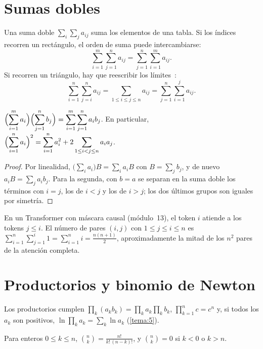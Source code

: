 \section{Sumas dobles}

Una suma doble $\sum_{i}\sum_{j}a_{ij}$ suma los elementos de una tabla. Si los índices recorren un rectángulo, el orden de suma puede intercambiarse:
\[
\sum_{i=1}^m\sum_{j=1}^na_{ij}=\sum_{j=1}^n\sum_{i=1}^ma_{ij}.
\]
Si recorren un triángulo, hay que reescribir los límites~\cite[§2.4]{gkp}:
\[
\sum_{i=1}^n\sum_{j=i}^na_{ij}=\sum_{1\le i\le j\le n}a_{ij}=\sum_{j=1}^n\sum_{i=1}^ja_{ij}.
\]

\begin{proposicion}\label{prop:producto-sumas}
$\displaystyle\Bigl(\sum_{i=1}^ma_i\Bigr)\Bigl(\sum_{j=1}^nb_j\Bigr)=\sum_{i=1}^m\sum_{j=1}^na_ib_j$. En particular, $\displaystyle\Bigl(\sum_{i=1}^na_i\Bigr)^2=\sum_{i=1}^na_i^2+2\sum_{1\le i<j\le n}a_ia_j$.
\end{proposicion}

\begin{proof}
Por linealidad, $\bigl(\sum_ia_i\bigr)B=\sum_ia_iB$ con $B=\sum_jb_j$, y de nuevo $a_iB=\sum_ja_ib_j$. Para la segunda, con $b=a$ se separan en la suma doble los términos con $i=j$, los de $i<j$ y los de $i>j$; los dos últimos grupos son iguales por simetría.
\end{proof}

\begin{ejemplo}\label{ej:causal}
En un Transformer con máscara causal (módulo~13), el token $i$ atiende a los tokens $j\le i$. El número de pares $(i,j)$ con $1\le j\le i\le n$ es $\sum_{i=1}^n\sum_{j=1}^i1=\sum_{i=1}^ni=\frac{n(n+1)}2$, aproximadamente la mitad de los $n^2$ pares de la atención completa.
\end{ejemplo}

\section{Productorios y binomio de Newton}

Los productorios cumplen $\prod_k(a_kb_k)=\prod_ka_k\prod_kb_k$, $\prod_{k=1}^nc=c^n$ y, si todos los $a_k$ son positivos, $\ln\prod_ka_k=\sum_k\ln a_k$ (\cref{tema:5}).

\begin{definicion}
Para enteros $0\le k\le n$, $\displaystyle\binom nk=\frac{n!}{k!\,(n-k)!}$, y $\binom nk=0$ si $k<0$ o $k>n$.
\end{definicion}


